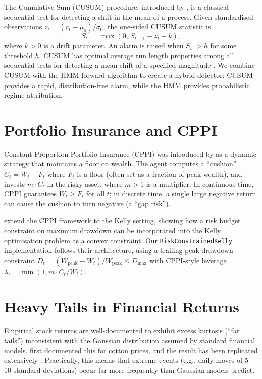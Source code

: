 The Cumulative Sum (CUSUM) procedure, introduced by \textcite{page1954},
is a classical sequential test for detecting a shift in the mean of a
process. Given standardised observations $z_t = (r_t - \mu_0)/\sigma_0$,
the one-sided CUSUM statistic is
\[
    S_t^- = \max(0,\, S_{t-1}^- - z_t - k),
\]
where $k > 0$ is a drift parameter. An alarm is raised when $S_t^- >
h$ for some threshold $h$. CUSUM has optimal average run length properties
among all sequential tests for detecting a mean shift of a specified
magnitude \parencite{moustakides1986optimal}. We combine CUSUM with the HMM
forward algorithm to create a hybrid detector: CUSUM provides a rapid,
distribution-free alarm, while the HMM provides probabilistic regime
attribution.

\section{Portfolio Insurance and CPPI}

Constant Proportion Portfolio Insurance (CPPI) was introduced by
\textcite{black1987simplifying} as a dynamic strategy that maintains a floor
on wealth. The agent computes a ``cushion'' $C_t = W_t - F_t$ where $F_t$ is
a floor (often set as a fraction of peak wealth), and invests $m \cdot C_t$
in the risky asset, where $m > 1$ is a multiplier. In continuous time, CPPI
guarantees $W_t \geq F_t$ for all $t$; in discrete time, a single large
negative return can cause the cushion to turn negative (a ``gap risk'').

\textcite{busseti2016risk} extend the CPPI framework to the Kelly setting,
showing how a risk budget constraint on maximum drawdown can be incorporated
into the Kelly optimisation problem as a convex constraint. Our
\texttt{RiskConstrainedKelly} implementation follows their architecture,
using a trailing peak drawdown constraint $D_t = (W_{\text{peak}} -
W_t)/W_{\text{peak}} \leq D_{\max}$ with CPPI-style leverage
$\lambda_t = \min(1, m \cdot C_t / W_t)$.

\section{Heavy Tails in Financial Returns}

Empirical stock returns are well-documented to exhibit excess kurtosis
(``fat tails'') inconsistent with the Gaussian distribution assumed by
standard financial models. \textcite{mandelbrot1963variation} first
documented this for cotton prices, and the result has been replicated
extensively \parencite{cont2001empirical}. Practically, this means that
extreme events (e.g., daily moves of 5--10 standard deviations) occur far
more frequently than Gaussian models predict.

